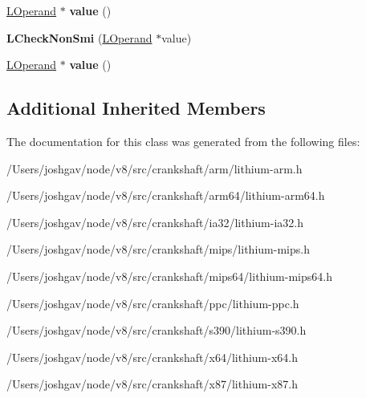 \begin{DoxyCompactItemize}
\item 
\hyperlink{classv8_1_1internal_1_1_l_operand}{L\+Operand} $\ast$ {\bfseries value} ()\hypertarget{classv8_1_1internal_1_1_l_check_non_smi_aa850e47e46c5796da01f0736e9073464}{}\label{classv8_1_1internal_1_1_l_check_non_smi_aa850e47e46c5796da01f0736e9073464}

\item 
{\bfseries L\+Check\+Non\+Smi} (\hyperlink{classv8_1_1internal_1_1_l_operand}{L\+Operand} $\ast$value)\hypertarget{classv8_1_1internal_1_1_l_check_non_smi_a889ca434ddda82d4605e6b44a5b21f2b}{}\label{classv8_1_1internal_1_1_l_check_non_smi_a889ca434ddda82d4605e6b44a5b21f2b}

\item 
\hyperlink{classv8_1_1internal_1_1_l_operand}{L\+Operand} $\ast$ {\bfseries value} ()\hypertarget{classv8_1_1internal_1_1_l_check_non_smi_aa850e47e46c5796da01f0736e9073464}{}\label{classv8_1_1internal_1_1_l_check_non_smi_aa850e47e46c5796da01f0736e9073464}

\end{DoxyCompactItemize}
\subsection*{Additional Inherited Members}


The documentation for this class was generated from the following files\+:\begin{DoxyCompactItemize}
\item 
/\+Users/joshgav/node/v8/src/crankshaft/arm/lithium-\/arm.\+h\item 
/\+Users/joshgav/node/v8/src/crankshaft/arm64/lithium-\/arm64.\+h\item 
/\+Users/joshgav/node/v8/src/crankshaft/ia32/lithium-\/ia32.\+h\item 
/\+Users/joshgav/node/v8/src/crankshaft/mips/lithium-\/mips.\+h\item 
/\+Users/joshgav/node/v8/src/crankshaft/mips64/lithium-\/mips64.\+h\item 
/\+Users/joshgav/node/v8/src/crankshaft/ppc/lithium-\/ppc.\+h\item 
/\+Users/joshgav/node/v8/src/crankshaft/s390/lithium-\/s390.\+h\item 
/\+Users/joshgav/node/v8/src/crankshaft/x64/lithium-\/x64.\+h\item 
/\+Users/joshgav/node/v8/src/crankshaft/x87/lithium-\/x87.\+h\end{DoxyCompactItemize}
